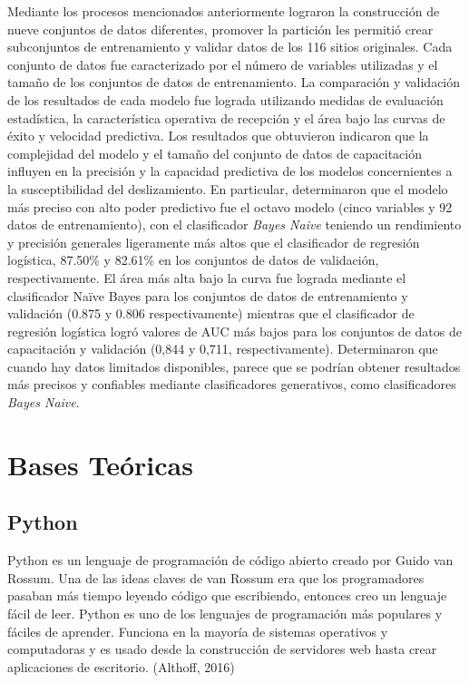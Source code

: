 Mediante los procesos mencionados anteriormente lograron la construcción de nueve conjuntos de datos diferentes, promover la partición les permitió crear subconjuntos de entrenamiento y validar datos de los 116 sitios originales. Cada conjunto de datos fue caracterizado por el número de variables utilizadas y el tamaño de los conjuntos de datos de entrenamiento. La comparación y validación de los resultados de cada modelo fue lograda utilizando medidas de evaluación estadística, la característica operativa de recepción y el área bajo las curvas de éxito y velocidad predictiva. Los resultados que obtuvieron indicaron que la complejidad del modelo y el tamaño del conjunto de datos de capacitación influyen en la precisión y la capacidad predictiva de los modelos concernientes a la susceptibilidad del deslizamiento. En particular, determinaron que el modelo más preciso con alto poder predictivo fue el octavo modelo (cinco variables y 92 datos de entrenamiento), con el clasificador \textit{Bayes Naive} teniendo un rendimiento y precisión generales ligeramente más altos que el clasificador de regresión logística, 87.50\% y 82.61\% en los conjuntos de datos de validación, respectivamente. El área más alta bajo la curva fue lograda mediante el clasificador Naïve Bayes para los conjuntos de datos de entrenamiento y validación (0.875 y 0.806 respectivamente) mientras que el clasificador de regresión logística logró valores de AUC más bajos para los conjuntos de datos de capacitación y validación (0,844 y 0,711, respectivamente). Determinaron que cuando hay datos limitados disponibles, parece que se podrían obtener resultados más precisos y confiables mediante clasificadores generativos, como clasificadores \textit{Bayes Naive}.

\section{Bases Te\'oricas}

\subsection{Python}

Python es un lenguaje de programación de código abierto creado por Guido van Rossum. Una de las ideas claves de van Rossum era que los programadores pasaban más tiempo leyendo código que escribiendo, entonces creo un lenguaje fácil de leer. Python es uno de los lenguajes de programación más populares y fáciles de aprender. Funciona en la mayoría de sistemas operativos y computadoras y es usado desde la construcción de servidores web hasta crear aplicaciones de escritorio. (Althoff, 2016)

